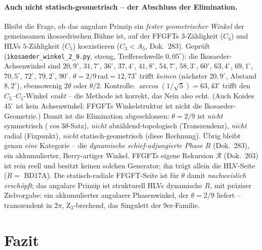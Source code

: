 \paragraph{Auch nicht statisch-geometrisch -- der Abschluss der Elimination.} Bleibt die Frage, ob das
angulare Prinzip ein \emph{fester geometrischer Winkel} der gemeinsamen ikosaedrischen Bühne ist, auf der
FFGFTs $3$-Zähligkeit ($C_3$) und HLVs $5$-Zähligkeit ($C_5$) koexistieren ($C_3<A_5$, Dok.~283).
Geprüft (\texttt{ikosaeder\_winkel\_2\_9.py}, streng, Trefferschwelle $0{,}05^\circ$): die
Ikosaeder-Achsenwinkel sind $20{,}9^\circ$, $31{,}7^\circ$, $36^\circ$, $37{,}4^\circ$, $41{,}8^\circ$,
$54{,}7^\circ$, $58{,}3^\circ$, $60^\circ$, $63{,}4^\circ$, $69{,}1^\circ$, $70{,}5^\circ$, $72^\circ$,
$79{,}2^\circ$, $90^\circ$. $\theta=2/9\,\mathrm{rad}=12{,}73^\circ$ trifft \emph{keinen} (nächster
$20{,}9^\circ$, Abstand $8{,}2^\circ$), ebensowenig $2\theta$ oder $\theta/2$. Kontrolle:
$\arccos(1/\sqrt5)=63{,}43^\circ$ trifft den $C_5$--$C_5$-Winkel \emph{exakt} -- die Methode ist korrekt,
das Nein also echt. (Auch Koides $45^\circ$ ist kein Achsenwinkel: FFGFTs Winkelstruktur ist nicht die
Ikosaeder-Geometrie.) Damit ist die Elimination abgeschlossen: $\theta=2/9$ ist \emph{nicht} symmetrisch
($\cos3\theta$-Satz), \emph{nicht} abzählend-topologisch (Transzendenz), \emph{nicht} radial (Fixpunkt),
\emph{nicht} statisch-geometrisch (diese Rechnung). Übrig bleibt genau \emph{eine} Kategorie -- die
\emph{dynamische schief-adjungierte Phase} $R$ (Dok.~283), ein akkumulierter, Berry-artiger Winkel.
FFGFTs eigene Rekursion $\mathcal R$ (Dok.~203) ist rein reell und besitzt keinen solchen Generator; ihn
trägt allein die HLV-Seite ($R=$ BD17A). Die statisch-radiale FFGFT-Seite ist für $\theta$ damit
\emph{nachweislich erschöpft}; das angulare Prinzip ist strukturell HLVs dynamische $R$, mit präziser
Zielvorgabe: ein akkumulierter angularer Phasenwinkel, der $\theta=2/9$ liefert -- transzendent in
$2\pi$, Z$_3$-brechend, das Singulett der $9$er-Familie.

\section{Fazit}

